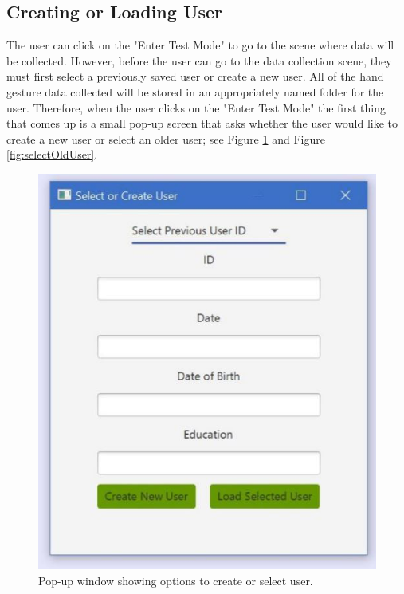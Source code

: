 \subsection{Creating or Loading User}
The user can click on the "Enter Test Mode" to go to the scene where data will be collected. However, before the user can go to the data collection scene, they must first select a previously saved user or create a new user. All of the hand gesture data collected will be stored in an appropriately named folder for the user. Therefore, when the user clicks on the "Enter Test Mode" the first thing that comes up is a small pop-up screen that asks whether the user would like to create a new user or select an older user; see Figure \ref{fig:createNewUser} and Figure \ref{fig:selectOldUser}. 
\begin{figure}[H]
    \centering
    \begin{minipage}{0.5\textwidth}
        \centering
        \includegraphics[scale=.55]{Figures/6_selectUser.JPG} 
        \caption{Pop-up window showing options to create or select user. }
		\label{fig:createNewUser}
    \end{minipage}\hfill

\end{figure}
